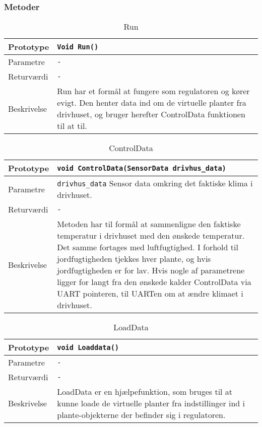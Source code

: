 \subsubsection{Metoder}

\begin{table}[h]
\begin{tabularx}{\textwidth}{| L{2.5 cm} | Z |} \hline
Prototype & \texttt{Void Run()} \\\hline
Parametre & \texttt{-} \\\hline
Returværdi & \texttt{-} \\\hline
Beskrivelse & Run har et formål at fungere som regulatoren og kører evigt. Den henter data ind om de virtuelle planter fra drivhuset, og bruger herefter ControlData funktionen til at til. \\\hline
\end{tabularx}
\caption{Run}
\label{table:Regulator_Run}
\end{table}

\clearpage

\begin{table}[h]
\begin{tabularx}{\textwidth}{| L{2.5 cm} | Z |} \hline
Prototype & \texttt{void ControlData(SensorData drivhus\_data)} \\\hline
Parametre & \texttt{drivhus\_data} \newline
Sensor data omkring det faktiske klima i drivhuset.\\\hline
Returværdi & \texttt{-} \\\hline
Beskrivelse & Metoden har til formål at sammenligne den faktiske temperatur i drivhuset med den ønskede temperatur. Det samme fortages med luftfugtighed. I forhold til jordfugtigheden tjekkes hver plante, og hvis jordfugtigheden er for lav. Hvis nogle af parametrene ligger for langt fra den ønskede kalder ControlData via UART pointeren, til UARTen om at ændre klimaet i drivhuset. \\\hline
\end{tabularx}
\caption{ControlData}
\label{table:Regulator_ControlData}
\end{table}

\begin{table}[h]
\begin{tabularx}{\textwidth}{| L{2.5 cm} | Z |} \hline
Prototype & \texttt{void Loaddata()} \\\hline
Parametre & \texttt{-} \\\hline
Returværdi & \texttt{-} \\\hline
Beskrivelse & LoadData er en hjælpefunktion, som bruges til at kunne loade de virtuelle planter fra indstillinger ind i plante-objekterne der befinder sig i regulatoren. \\\hline
\end{tabularx}
\caption{LoadData}
\label{table:Regulator_LoadData}
\end{table}